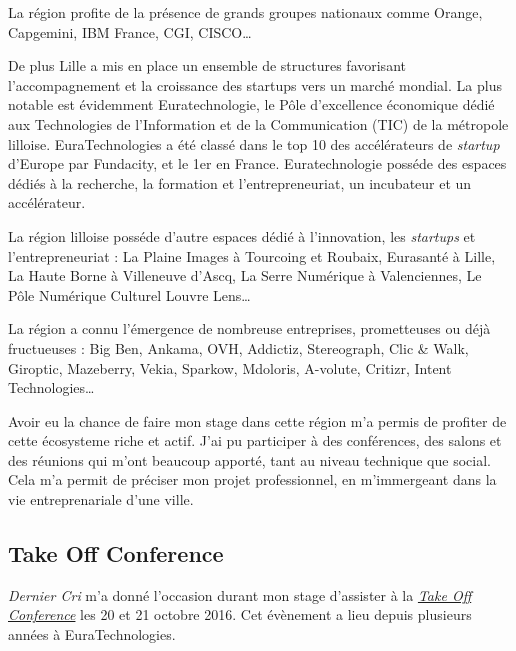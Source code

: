 \documentclass[12pt,a4paper]{article}
\begin{document}
  \bigskip

  La région profite de la présence de grands groupes nationaux comme
  Orange, Capgemini, IBM France, CGI, CISCO\ldots{}

  \bigskip

  De plus Lille a mis en place un ensemble de structures favorisant
  l'accompagnement et la croissance des startups vers un marché mondial.
  La plus notable est évidemment Euratechnologie, le Pôle d'excellence
  économique dédié aux Technologies de l'Information et de la
  Communication (TIC) de la métropole lilloise. EuraTechnologies a été
  classé dans le top 10 des accélérateurs de \emph{startup} d'Europe par
  Fundacity, et le 1er en France. Euratechnologie posséde des espaces
  dédiés à la recherche, la formation et l'entrepreneuriat, un incubateur
  et un accélérateur.

  \bigskip

  La région lilloise posséde d'autre espaces dédié à l'innovation, les
  \emph{startups} et l'entrepreneuriat : La Plaine Images à Tourcoing et
  Roubaix, Eurasanté à Lille, La Haute Borne à Villeneuve d'Ascq, La Serre
  Numérique à Valenciennes, Le Pôle Numérique Culturel Louvre Lens\ldots{}

  \bigskip

  La région a connu l'émergence de nombreuse entreprises, prometteuses ou
  déjà fructueuses : Big Ben, Ankama, OVH, Addictiz, Stereograph, Clic \&
  Walk, Giroptic, Mazeberry, Vekia, Sparkow, Mdoloris, A-volute, Critizr,
  Intent Technologies\ldots{}

  \bigskip

  Avoir eu la chance de faire mon stage dans cette région m'a permis de
  profiter de cette écosysteme riche et actif. J'ai pu participer à des
  conférences, des salons et des réunions qui m'ont beaucoup apporté, tant
  au niveau technique que social. Cela m'a permit de préciser mon projet
  professionnel, en m'immergeant dans la vie entreprenariale d'une ville.

  \bigskip

  \subsection{Take Off Conference}\label{take-off-conference}

  \bigskip

  \emph{Dernier Cri} m'a donné l'occasion durant mon stage d'assister à la
  \href{http://takeoffconf.com/2016}{\emph{Take Off Conference}} les 20 et
  21 octobre 2016. Cet évènement a lieu depuis plusieurs années à
  EuraTechnologies.
\end{document}
